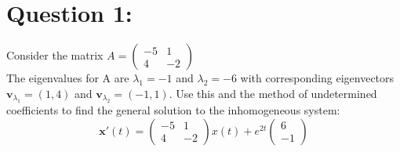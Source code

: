 \documentclass[12pt]{article}
\begin{document}
\large
\begin{center}
\end{center}

\section*{Question 1:}
Consider the matrix $A = \begin{pmatrix} -5 & 1 \\ 4 & -2 \end{pmatrix}$ \\
The eigenvalues for A are
$\lambda_1 = -1$ and
$\lambda_2 = -6$ with corresponding eigenvectors 
$\mathbf{v}_{\lambda_1} = (1, 4)$ and 
$\mathbf{v}_{\lambda_2} = (-1, 1)$.
Use this and the method of undetermined coefficients to find the general solution to the inhomogeneous system:
\[\mathbf{x}'(t) = \begin{pmatrix} -5 & 1 \\ 4 & -2 \end{pmatrix} x(t) + e^{2t}\begin{pmatrix} 6 \\ -1 \end{pmatrix}\]
\end{document}
